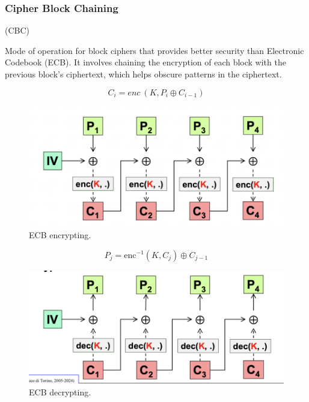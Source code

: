 \clearpage
\subsubsection{Cipher Block Chaining}

\begin{center}
    (CBC)
\end{center}
Mode of operation for block ciphers that provides better security than Electronic Codebook (ECB). It involves chaining the encryption of each block with the previous block's ciphertext, which helps obscure patterns in the ciphertext.


\begin{multicols}{2}
    \begin{equation*}
        \boxed{C_i = enc \ (K, P_i \oplus C_{i-1})}
    \end{equation*}
    \begin{figure}[H]
        \includegraphics[width=\linewidth]{Images/Cryptography/CBCEncrypt.png}
        \caption{ECB encrypting.}
    \end{figure}
    \columnbreak
    \begin{equation*}
        \boxed{P_j = \text{enc}^{-1}(K, C_j) \oplus C_{j-1}}
    \end{equation*}
    \begin{figure}[H]
        \includegraphics[width=\linewidth]{Images/Cryptography/CBCDecrypt.png}
        \caption{ECB decrypting.}
    \end{figure}
\end{multicols}

